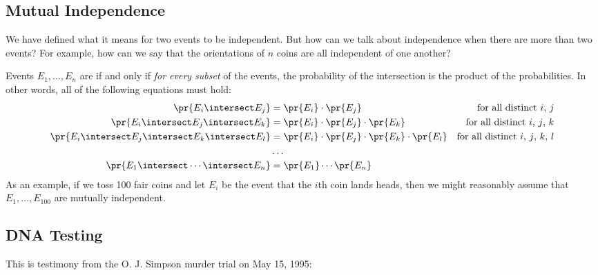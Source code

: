 \subsection{Mutual Independence}

We have defined what it means for two events to be independent.  But
how can we talk about independence when there are more than two
events?  For example, how can we say that the orientations of $n$
coins are all independent of one another?

Events $E_1, \ldots, E_n$ are  if and only
if \textit{for every subset} of the events, the probability of the
intersection is the product of the probabilities.  In other words, all
of the following equations must hold:
%
\begin{align*}
\pr{E_i \intersect E_j}
    & = \pr{E_i} \cdot \pr{E_j}
    & \text{for all distinct $i$, $j$} \\
\pr{E_i \intersect E_j \intersect E_k}
    & = \pr{E_i} \cdot \pr{E_j} \cdot \pr{E_k}
     & \text{for all distinct $i$, $j$, $k$} \\
\pr{E_i \intersect E_j \intersect E_k \intersect E_l}
    & = \pr{E_i} \cdot \pr{E_j} \cdot \pr{E_k} \cdot \pr{E_l}
    & \text{for all distinct $i$, $j$, $k$, $l$} \\
    & \ldots \\
\pr{E_1 \intersect \cdots \intersect E_n} & = \pr{E_1} \cdots \pr{E_n}
\end{align*}
%
As an example, if we toss 100 fair coins and let $E_i$ be the event
that the $i$th coin lands heads, then we might reasonably assume that
$E_1, \dots, E_{100}$ are mutually independent.

\iffalse

\subsection{DNA Testing}

This is testimony from the O. J. Simpson murder trial on May 15, 1995:

